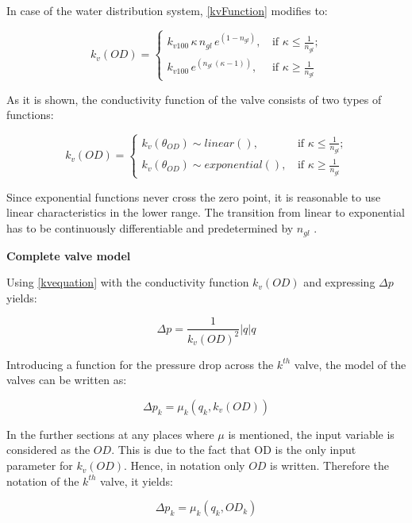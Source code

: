 In case of the water distribution system, \eqref{kvFunction} modifies to: 

\begin{equation}
 k_v(OD) =
		\left\{
		\begin{array}{ll}
		
		k_{v100} \, \kappa \, n_{gl} \, e^{(1-n_{gl})} \text{,} & \mbox{ if } 	\kappa \leq \frac{1}					{n_{gl}} \text{;}
\\
		k_{v100} \, e^{(n_{gl} \,(\kappa-1))} \text{,} & \mbox{ if } \kappa \geq \frac{1}{n_{gl}}

		\end{array}
		\right.
\end{equation}	

As it is shown, the conductivity function of the valve consists of two types of functions: 

\begin{equation}
 k_v(OD) =
		\left\{
		\begin{array}{ll}
		
		k_v(\theta_{OD}) \sim linear() \text{,} & \mbox{ if } 	\kappa \leq \frac{1}					{n_{gl}} \text{;}
\\
		k_v(\theta_{OD}) \sim exponential() \text{,} & \mbox{ if } \kappa \geq \frac{1}{n_{gl}}

		\end{array}
		\right.
\end{equation}	

Since exponential functions never cross the zero point, it is reasonable to use linear characteristics in the lower range. The transition from linear to exponential has to be continuously differentiable and predetermined by $n_{gl}$ \citep{Kallesoe2009,keller}.


\textbf{Complete valve model}
\label{unittransform}

Using \eqref{kvequation} with the conductivity function $k_v(OD)$ and expressing $\Delta p$ yields: 

\begin{equation}
\label{CompleteValveModel}
 \Delta p = \frac{1}{k_v(OD)^2} |q| q
\end{equation}

Introducing a function for the pressure drop across the $k^{th}$ valve, the model of the valves can be written as: 

\begin{equation}
\label{CompactValveModel}
 \Delta p_k = \mu_k(q_k,k_v(OD)) 
\end{equation}

In the further sections at any places where $\mu$ is mentioned, the input variable is considered as the $OD$. This is due to the fact that OD is the only input parameter for $k_v(OD)$. Hence, in notation only $OD$ is written. Therefore the notation of the $k^{th}$ valve, it yields: 

\begin{equation}
\label{CompactValveModel}
 \Delta p_k = \mu_k(q_k,OD_k) 
\end{equation}



 
 
 